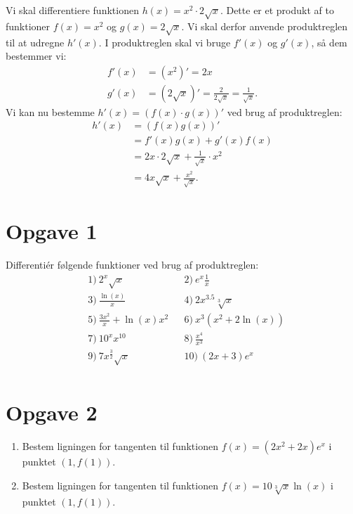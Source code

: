 \begin{exa}
Vi skal differentiere funktionen $h(x) = x^2\cdot 2\sqrt{x}$. Dette er et produkt af to funktioner
$f(x) = x^2$ og $g(x)= 2\sqrt{x}$. Vi skal derfor anvende produktreglen til at udregne $h'(x)$. I produktreglen skal vi bruge $f'(x)$ og $g'(x)$, så dem bestemmer vi:
\begin{align*}
f'(x) &= (x^2)' = 2x\\
g'(x) &= (2\sqrt{x})' = \frac{2}{2\sqrt{x}} = \frac{1}{\sqrt{x}}.
\end{align*} 
Vi kan nu bestemme $h'(x) = (f(x)\cdot g(x))'$ ved brug af produktreglen:
\begin{align*}
h'(x) &= (f(x)g(x))' \\
&= f'(x)g(x)+g'(x)f(x) \\
&= 2x\cdot 2\sqrt{x} + \frac{1}{\sqrt{x}}\cdot x^2\\
&= 4x\sqrt{x} + \frac{x^2}{\sqrt{x}}.
\end{align*}
\end{exa}

\section*{Opgave 1}
Differentiér følgende funktioner ved brug af produktreglen:
\begin{align*}
&1) \   2^x\sqrt{x}   &&2) \  e^x\frac{1}{x}     \\
&3) \  \frac{\ln(x)}{x}    &&4) \   2x^{3.5}\sqrt[3]{x}    \\
&5) \  \frac{3x^2}{x} + \ln(x)x^2    &&6) \ x^3(x^2+2\ln(x))      \\
&7) \  10^xx^{10}    &&8) \  \frac{x^4}{x^3}     \\
&9) \   7x^{\frac{3}{2}}\sqrt{x}   &&10) \   (2x+3)e^x    \\
\end{align*}
\section*{Opgave 2}
\begin{enumerate}[label=\roman*)]
\item Bestem ligningen for tangenten til funktionen $f(x)=(2x^2+2x)e^x$ i punktet $(1,f(1))$.
\item Bestem ligningen for tangenten til funktionen $f(x) = 10\sqrt[3]{x}\ln(x)$ i punktet $(1,f(1))$.
\end{enumerate}